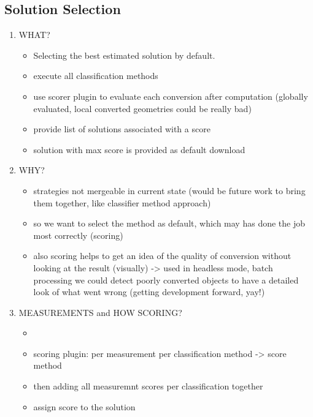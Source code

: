 \documentclass[../ClassicThesis.tex]{subfiles}
\begin{document}
\subsection{Solution Selection}

\begin{enumerate}
\item WHAT?
  \begin{itemize}
  \item Selecting the best estimated solution by default.
  \item execute all classification methods
  \item use scorer plugin to evaluate each conversion after computation
    (globally evaluated, local converted geometries could be really bad)
  \item provide list of solutions associated with a score
  \item solution with max score is provided as default download
  \end{itemize}

\item WHY?
  \begin{itemize}
  \item strategies not mergeable in current state (would be future work to bring
    them together, like classifier method approach)
  \item so we want to select the method as default, which may has done the job
    most correctly (scoring)
  \item also scoring helps to get an idea of the quality of conversion without
    looking at the result (visually) -> used in headless mode, batch processing
    we could detect poorly converted objects to have a detailed look of what
    went wrong (getting development forward, yay!)
  \end{itemize}

\item MEASUREMENTS and HOW SCORING?
  \begin{itemize}
  \item {}
  \item scoring plugin: per measurement per classification method -> score
    method
  \item then adding all measuremnt scores per classification together
  \item assign score to the solution
  \end{itemize}


\end{enumerate}
\end{document}
